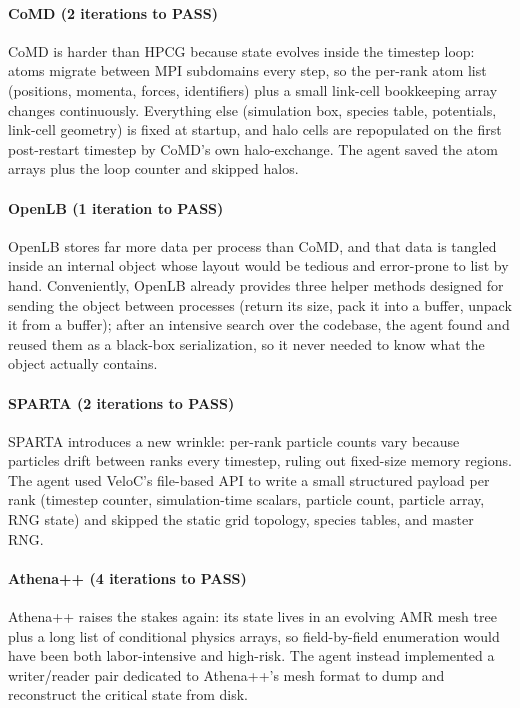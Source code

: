 \documentclass[conference]{IEEEtran}
\begin{document}
\paragraph{CoMD (2 iterations to PASS)}
CoMD is harder than HPCG because state evolves inside the timestep loop: atoms migrate between MPI subdomains every step, so the per-rank atom list (positions, momenta, forces, identifiers) plus a small link-cell bookkeeping array changes continuously. Everything else (simulation box, species table, potentials, link-cell geometry) is fixed at startup, and halo cells are repopulated on the first post-restart timestep by CoMD's own halo-exchange. The agent saved the atom arrays plus the loop counter and skipped halos.

\paragraph{OpenLB (1 iteration to PASS)}
OpenLB stores far more data per process than CoMD, and that data is tangled inside an internal object whose layout would be tedious and error-prone to list by hand. Conveniently, OpenLB already provides three helper methods designed for sending the object between processes (return its size, pack it into a buffer, unpack it from a buffer); after an intensive search over the codebase, the agent found and reused them as a black-box serialization, so it never needed to know what the object actually contains.

\paragraph{SPARTA (2 iterations to PASS)}
SPARTA introduces a new wrinkle: per-rank particle counts vary because particles drift between ranks every timestep, ruling out fixed-size memory regions. The agent used VeloC's file-based API to write a small structured payload per rank (timestep counter, simulation-time scalars, particle count, particle array, RNG state) and skipped the static grid topology, species tables, and master RNG.

\paragraph{Athena++ (4 iterations to PASS)}
Athena++ raises the stakes again: its state lives in an evolving AMR mesh tree plus a long list of conditional physics arrays, so field-by-field enumeration would have been both labor-intensive and high-risk. The agent instead implemented a writer/reader pair dedicated to Athena++'s mesh format to dump and reconstruct the critical state from disk.
\end{document}
